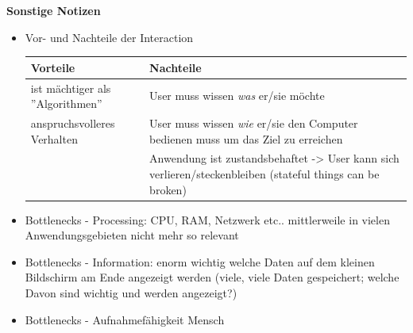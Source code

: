 \textbf{Sonstige Notizen}
\begin{itemize}
	\item Vor- und Nachteile der Interaction
	\begin{table}[!h]
		\centering
		\begin{tabular}{|p{20em}|p{20em}|}
			\hline
			\textbf{Vorteile} & \textbf{Nachteile}\\
			\hline
			\tabitem ist mächtiger als ''Algorithmen'' & \tabitem User muss wissen \textit{was} er/sie möchte\\
			\tabitem anspruchsvolleres Verhalten & \tabitem User muss wissen \textit{wie} er/sie den Computer bedienen muss um das Ziel zu erreichen\\
			 & \tabitem Anwendung ist zustandsbehaftet -> User kann sich verlieren/steckenbleiben (stateful things can be broken)\\
			\hline
		\end{tabular}
	\end{table}
	
	\item Bottlenecks - Processing: CPU, RAM, Netzwerk etc.. mittlerweile in vielen Anwendungsgebieten nicht mehr so relevant
	\item Bottlenecks - Information: enorm wichtig welche Daten auf dem kleinen Bildschirm am Ende angezeigt werden (viele, viele Daten gespeichert; welche Davon sind wichtig und werden angezeigt?)
	\item Bottlenecks - Aufnahmefähigkeit Mensch
\end{itemize}


